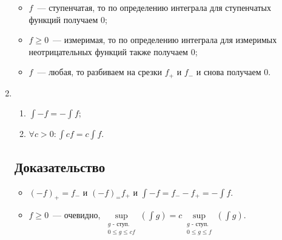 \documentclass{article}
\begin{document}
\begin{enumerate}
                    \begin{itemize}
                    
                        \item $f$~--- ступенчатая, то по определению интеграла для ступенчатых функций получаем $0$;
                        
                        \item $f \geqslant 0$~--- измеримая, то по определению интеграла для измеримых неотрицательных функций также получаем $0$;
                        
                        \item $f$~--- любая, то разбиваем на срезки $f_+$ и $f_-$ и снова получаем $0$.
                        
                    \end{itemize}
                    
            \item 
            
                \begin{enumerate}
                
                    \item $\int -f = - \int f$;
                    \item $\forall c > 0 : \int cf = c \int f$.
                
                \end{enumerate}
                
                \subsection{Доказательство}
                
                    \begin{itemize}
                    
                        \item $(-f)_+ = f_-$ и $(-f)_ = f_+$ и $\int -f = f_- - f_+ = - \int f$.
                    
                        \item $f \geqslant 0$~--- очевидно, $\sup\limits_{\substack{\text{$g$ - ступ.} \\ 0 \leqslant g \leqslant cf}} \left( \int g \right) = c \sup\limits_{\substack{\text{$g$ - ступ.} \\ 0 \leqslant g \leqslant f}} \left( \int g \right)$.
                        

\end{itemize}
\end{enumerate}
\end{document}
